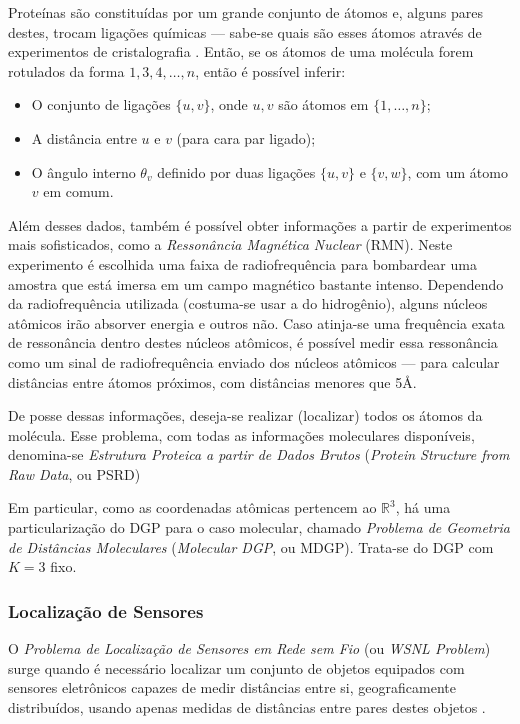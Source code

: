 Proteínas são constituídas por um grande conjunto de átomos e, alguns pares destes, trocam ligações químicas --- sabe-se quais são esses átomos através de experimentos de cristalografia \cite{ramachandran1974MolStructure}. Então, se os átomos de uma molécula forem rotulados da forma $1,3,4,\dots,n$, então é possível inferir: 
\begin{itemize}
	\item O conjunto de ligações $\{u,v\}$, onde $u,v$ são átomos em $\{1,\dots,n\}$;
	\item A distância entre $u$ e $v$ (para cara par ligado);
	\item O ângulo interno $\theta_v$ definido por duas ligações $\{u,v\}$ e $\{v,w\}$, com um átomo $v$ em comum.
\end{itemize} 

Além desses dados, também é possível obter informações a partir de experimentos mais sofisticados, como a \textit{Ressonância Magnética Nuclear} (RMN). Neste experimento é escolhida uma faixa de radiofrequência para bombardear uma amostra que está imersa em um campo magnético bastante intenso. Dependendo da radiofrequência utilizada (costuma-se usar a do hidrogênio), alguns núcleos atômicos irão absorver energia e outros não. Caso atinja-se uma frequência exata de ressonância dentro destes núcleos atômicos, é possível medir essa ressonância como um sinal de radiofrequência enviado dos núcleos atômicos --- para calcular distâncias entre átomos próximos, com distâncias menores que 5\AA.

De posse dessas informações, deseja-se realizar (localizar) todos os átomos da molécula. Esse problema, com todas as informações moleculares disponíveis, denomina-se \textit{Estrutura Proteica a partir de Dados Brutos} (\textit{Protein Structure from Raw Data}, ou PSRD)

Em particular, como as coordenadas atômicas pertencem ao $\mathbb{R}^3$, há uma particularização do DGP para o caso molecular, chamado \textit{Problema de Geometria de Distâncias Moleculares} (\textit{Molecular DGP}, ou MDGP). Trata-se do DGP com $K = 3$ fixo.

\subsubsection{Localização de Sensores}

O \textit{Problema de Localização de Sensores em Rede sem Fio} (ou \textit{WSNL Problem}) surge quando é necessário localizar um conjunto de objetos equipados com sensores eletrônicos capazes de medir distâncias entre si, geograficamente distribuídos, usando apenas medidas de distâncias entre pares destes objetos \cite{yemini1978positioning}. 

